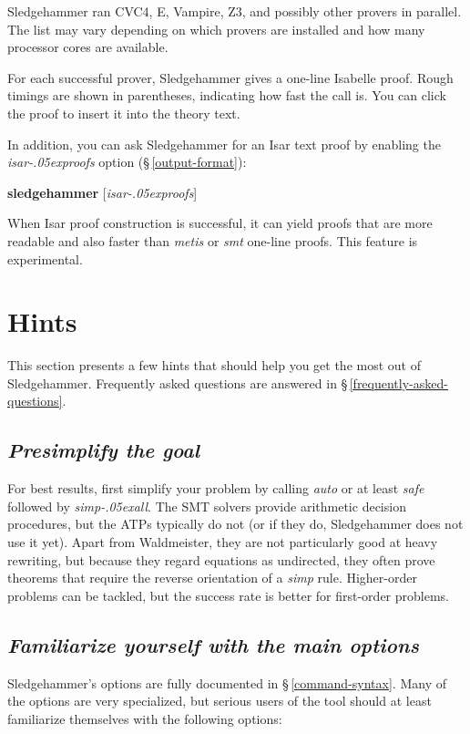 \documentclass[a4paper,12pt]{article}
\let\oldS=\S
\def\S{\oldS\,}
\renewcommand\_{\hbox{\textunderscore\kern-.05ex}}
\begin{document}
Sledgehammer ran CVC4, E, Vampire, Z3, and possibly other provers in parallel.
The list may vary depending on which provers are installed and how many
processor cores are available.

For each successful prover, Sledgehammer gives a one-line Isabelle proof. Rough
timings are shown in parentheses, indicating how fast the call is. You can
click the proof to insert it into the theory text.

In addition, you can ask Sledgehammer for an Isar text proof by enabling the
\textit{isar\_proofs} option (\S\ref{output-format}):

\prew
\textbf{sledgehammer} [\textit{isar\_proofs}]
\postw

When Isar proof construction is successful, it can yield proofs that are more
readable and also faster than \textit{metis} or \textit{smt} one-line
proofs. This feature is experimental.


\section{Hints}
\label{hints}

This section presents a few hints that should help you get the most out of
Sledgehammer. Frequently asked questions are answered in
\S\ref{frequently-asked-questions}.

\newcommand\point[1]{\subsection{\slshape #1}}


\point{Presimplify the goal}

For best results, first simplify your problem by calling \textit{auto} or at
least \textit{safe} followed by \textit{simp\_all}. The SMT solvers provide
arithmetic decision procedures, but the ATPs typically do not (or if they do,
Sledgehammer does not use it yet). Apart from Waldmeister, they are not
particularly good at heavy rewriting, but because they regard equations as
undirected, they often prove theorems that require the reverse orientation of a
\textit{simp} rule. Higher-order problems can be tackled, but the success rate
is better for first-order problems.


\point{Familiarize yourself with the main options}

Sledgehammer's options are fully documented in \S\ref{command-syntax}. Many of
the options are very specialized, but serious users of the tool should at least
familiarize themselves with the following options:
\end{document}

